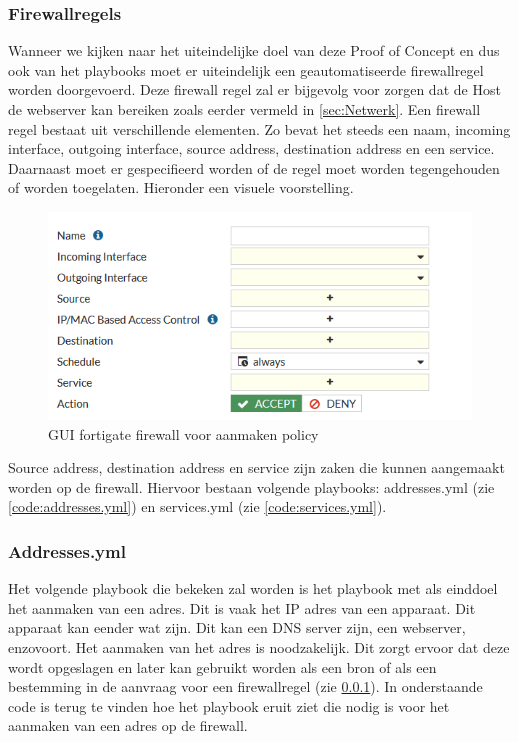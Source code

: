 \subsubsection{Firewallregels}
\label{subsub:firewallregels}
Wanneer we kijken naar het uiteindelijke doel van deze Proof of Concept en dus ook van het playbooks moet er uiteindelijk een geautomatiseerde firewallregel worden doorgevoerd. Deze firewall regel zal er bijgevolg voor zorgen dat de Host de webserver kan bereiken zoals eerder vermeld in \ref{sec:Netwerk}.
Een firewall regel bestaat uit verschillende elementen. Zo bevat het steeds een naam, incoming interface, outgoing interface, source address, destination address en een service. Daarnaast moet er gespecifieerd worden of de regel moet worden tegengehouden of worden toegelaten. Hieronder een visuele voorstelling.
\begin{figure}[h]
    \centering
    \includegraphics{bachproef/graphics/Policy.png}
    \caption{GUI fortigate firewall voor aanmaken policy}
    \label{fig:GUI}
\end{figure}
Source address, destination address en service zijn zaken die kunnen aangemaakt worden op de firewall. Hiervoor bestaan volgende playbooks: addresses.yml (zie \ref{code:addresses.yml}) en services.yml (zie \ref{code:services.yml}). 
\subsubsection{Addresses.yml}
\label{subsub:addresses.yml}
 Het volgende playbook die bekeken zal worden is het playbook met als einddoel het aanmaken van een adres. Dit is vaak het IP adres van een apparaat. Dit apparaat kan eender wat zijn. Dit kan een DNS server zijn, een webserver, enzovoort. Het aanmaken van het adres is noodzakelijk. Dit zorgt ervoor dat deze wordt opgeslagen en later kan gebruikt worden als een bron of als een bestemming in de aanvraag voor een firewallregel (zie \ref{subsub:firewallregels}). In onderstaande code is terug te vinden hoe het playbook eruit ziet die nodig is voor het aanmaken van een adres op de firewall.

